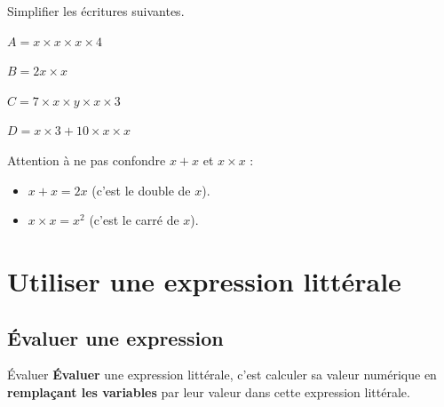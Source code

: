\documentclass[a4paper]{book}
\begin{document}
    
    \begin{exemple}
        Simplifier les écritures suivantes.

        \medskip

        \begin{minipage}{0.24\linewidth}
            $A=x\times x\times x \times 4$

            \vspace{1cm}
        \end{minipage}
        \hfill\vline\hfill
        \begin{minipage}{0.24\linewidth}
            $B=2x\times x$

            \vspace{1cm}
        \end{minipage}
        \hfill\vline\hfill
        \begin{minipage}{0.24\linewidth}
            $C=7\times x\times y \times x \times 3$

            \vspace{1cm}
        \end{minipage}
        \hfill\vline\hfill
        \begin{minipage}{0.24\linewidth}
            $D=x\times3+10\times x\times x$

            \vspace{1cm}
        \end{minipage}
    \end{exemple}
    
    
    \begin{remarque}
        Attention à ne pas confondre $x + x$ et $x \times x$ :
        \begin{itemize}
            \item $x + x = 2x$ (c'est le double de $x$).
            \item $x \times x = x^2$ (c'est le carré de $x$).
        \end{itemize}
    \end{remarque}
    
    
\section{Utiliser une expression littérale}  
\subsection{Évaluer une expression}
    
    \begin{definitionTitre}{Évaluer}
        \textbf{Évaluer} une expression littérale, c'est calculer sa valeur numérique en \textbf{remplaçant les variables} par leur valeur dans cette expression littérale.
    \end{definitionTitre}
\end{document}
